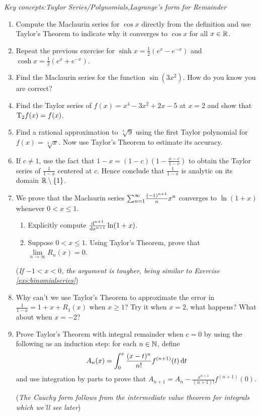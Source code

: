 \begin{exercises}
	\emph{Key concepts:\quad Taylor Series/Polynomials,\quad Lagrange's form for Remainder}
	
	\begin{enumerate}
	  \item Compute the Maclaurin series for $\cos x$ directly from the definition and use Taylor's Theorem to indicate why it converges to $\cos x$ for all $x\in \R$.
	  
	  \item Repeat the previous exercise for $\sinh x=\frac 12(e^x-e^{-x})$ and $\cosh x=\frac 12(e^x+e^{-x})$.
	  
	  
	  \item Find the Maclaurin series for the function $\sin(3x^2)$. How do you know you are correct?
	  
	  
	  \item Find the Taylor series of $f(x)=x^4-3x^2+2x-5$ at $x=2$ and show that $\rT_2 f(x)=f(x)$.
	  
	  
	  \item Find a rational approximation to $\sqrt[3]{9}$ using the first Taylor polynomial for $f(x)=\sqrt[3]{x}$. Now use Taylor's Theorem to estimate its accuracy.
	  
	  
	  \item If $c\neq 1$, use the fact that $1-x=(1-c)\left(1-\frac{x-c}{1-c}\right)$ to obtain the Taylor series of $\frac 1{1-x}$ centered at $c$. Hence conclude that $\frac 1{1-x}$ is analytic on its domain $\R\setminus\{1\}$.
	  
	  
	 	\item We prove that the Maclaurin series $\smash[b]{\sum_{n=1}^\infty} \frac{(-1)^{n+1}}nx^n$ converges to $\ln(1+x)$ whenever $0<x\le 1$.
	 	\begin{enumerate}
	 	  \item Explicitly compute $\diff[^{n+1}]{x^{n+1}}\ln(1+x)$. 
	 	  \item Suppose $0<x\le 1$. Using Taylor's Theorem, prove that $\lim\limits_{n\to\infty}R_n(x)=0$.
		\end{enumerate}
		(\emph{If $-1<x<0$, the argument is tougher, being similar to Exercise \ref{exs:binomialseries}})
		
		
		\item Why can't we use Taylor's Theorem to approximate the error in $\frac 1{1-x}=1+x+R_1(x)$ when $x\ge 1$? Try it when $x=2$, what happens? What about when $x=-2$?
	 	
	 	
		\item Prove Taylor's Theorem with integral remainder when $c=0$ by using the following as an induction step: for each $n\in\N$, define
	 	\[
	 		A_n(x)=\int_0^x\frac{(x-t)^n}{n!}f^{(n+1)}(t)\,\dt
	 	\]
	 	and use integration by parts to prove that $A_{n+1}=A_n-\frac{x^{n+1}}{(n+1)!}f^{(n+1)}(0)$.\par
	 	(\emph{The Cauchy form follows from the intermediate value theorem for integrals which we'll see later})
	 	

\end{enumerate}
\end{exercises}
